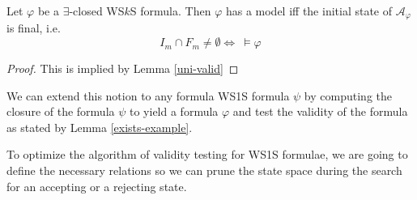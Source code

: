 \begin{lemma}\label{exists-example}
Let $\varphi$ be a $\exists$-closed WS$k$S formula. Then $\varphi$ has a model
iff the initial state of $\mathcal{A}_\varphi$ is final, i.e.
\begin{equation}
 I_m \cap F_m \neq \emptyset \Leftrightarrow\ \models \varphi
\end{equation}
\end{lemma}

\begin{proof}
This is implied by Lemma \ref{uni-valid}
\end{proof}

We can extend this notion to any formula WS1S formula $\psi$ by computing the
closure of the formula $\psi$ to yield a formula $\varphi$ and test the validity
of the formula as stated by Lemma \ref{exists-example}.

% 
% 

To optimize the algorithm of validity testing for WS1S formulae, we are going
to define the necessary relations so we can prune the state space during the
search for an accepting or a rejecting state. 

